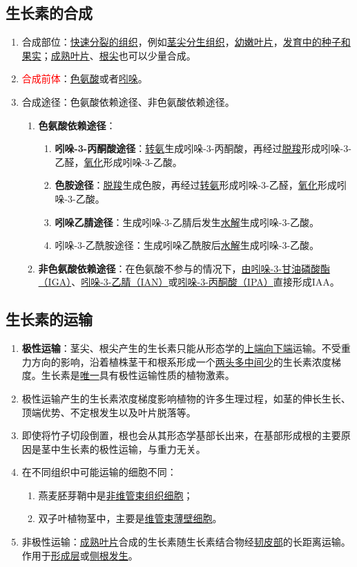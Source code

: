 \subsection{生长素的合成}
\begin{enumerate}
    \item 合成部位：\uline{快速分裂的组织}，例如\uline{茎尖分生组织}，\uline{幼嫩叶片}，\uline{发育中的种子和果实}；\uline{成熟叶片}、\uline{根尖}也可以少量合成。
    \item \textcolor{red}{合成前体}：\uline{色氨酸}或者\uline{吲哚}。
    \item 合成途径：色氨酸依赖途径、非色氨酸依赖途径。
    \begin{enumerate}
        \item \textbf{色氨酸依赖途径}：
        \begin{enumerate}
            \item \textbf{吲哚-3-丙酮酸途径}：\uline{转氨}生成吲哚-3-丙酮酸，再经过\uline{脱羧}形成吲哚-3-乙醛，\uline{氧化}形成吲哚-3-乙酸。
            \item \textbf{色胺途径}：\uline{脱羧}生成色胺，再经过\uline{转氨}形成吲哚-3-乙醛，\uline{氧化}形成吲哚-3-乙酸。
            \item \textbf{吲哚乙腈途径}：生成吲哚-3-乙腈后发生\uline{水解}生成吲哚-3-乙酸。
            \item 吲哚-3-乙酰胺途径：生成吲哚乙酰胺后\uline{水解}生成吲哚-3-乙酸。
        \end{enumerate}
        \item \textbf{非色氨酸依赖途径}：在色氨酸不参与的情况下，\uline{由吲哚-3-甘油磷酸酯（IGA）}、\uline{吲哚-3-乙腈（IAN）}或\uline{吲哚-3-丙酮酸（IPA）}直接形成IAA。
    \end{enumerate}    
\end{enumerate}
\subsection{生长素的运输}
\begin{enumerate}
    \item \textbf{极性运输}：茎尖、根尖产生的生长素只能从形态学的\uline{上端向下端}运输。不受重力方向的影响，沿着植株茎干和根系形成一个\uline{两头多中间少}的生长素浓度梯度。生长素是\uline{唯一}具有极性运输性质的植物激素。
    \item 极性运输产生的生长素浓度梯度影响植物的许多生理过程，如茎的伸长生长、顶端优势、不定根发生以及叶片脱落等。
    \item 即使将竹子切段倒置，根也会从其形态学基部长出来，在基部形成根的主要原因是茎中生长素的极性运输，与重力无关。
    \item 在不同组织中可能运输的细胞不同：
    \begin{enumerate}
        \item 燕麦胚芽鞘中是\uline{非维管束组织细胞}；
        \item 双子叶植物茎中，主要是\uline{维管束薄壁细胞}。
    \end{enumerate}
    \item 非极性运输：\uline{成熟叶片}合成的生长素随生长素结合物经\uline{韧皮部}的长距离运输。作用于\uline{形成层}或\uline{侧根发生}。
\end{enumerate}
